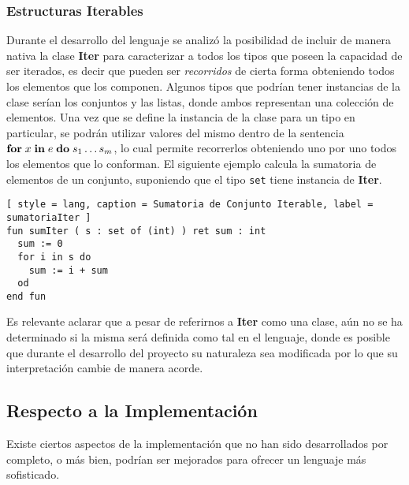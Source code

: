 \subsubsection{Estructuras Iterables}

Durante el desarrollo del lenguaje se analizó la posibilidad de incluir de manera nativa la clase \textbf{Iter} para caracterizar a todos los tipos que poseen la capacidad de ser iterados, es decir que pueden ser \textit{recorridos} de cierta forma obteniendo todos los elementos que los componen.
Algunos tipos que podrían tener instancias de la clase serían los conjuntos y las listas, donde ambos representan una colección de elementos.
Una vez que se define la instancia de la clase para un tipo en particular, se podrán utilizar valores del mismo dentro de la sentencia $\mathbf{for} \; x \; \mathbf{in} \; e \; \mathbf{do} \; s_{1} \ldots s_{m}$, lo cual permite recorrerlos obteniendo uno por uno todos los elementos que lo conforman.
El siguiente ejemplo calcula la sumatoria de elementos de un conjunto, suponiendo que el tipo \lstinline[style = lang]{set} tiene instancia de \textbf{Iter}.

\begin{lstlisting}[ style = lang, caption = Sumatoria de Conjunto Iterable, label = sumatoriaIter ]
fun sumIter ( s : set of (int) ) ret sum : int
  sum := 0
  for i in s do
    sum := i + sum
  od
end fun
\end{lstlisting}

Es relevante aclarar que a pesar de referirnos a \textbf{Iter} como una clase, aún no se ha determinado si la misma será definida como tal en el lenguaje, donde es posible que durante el desarrollo del proyecto su naturaleza sea modificada por lo que su interpretación cambie de manera acorde.

\subsection{Respecto a la Implementación}

Existe ciertos aspectos de la implementación que no han sido desarrollados por completo, o más bien, podrían ser mejorados para ofrecer un lenguaje más sofisticado.

